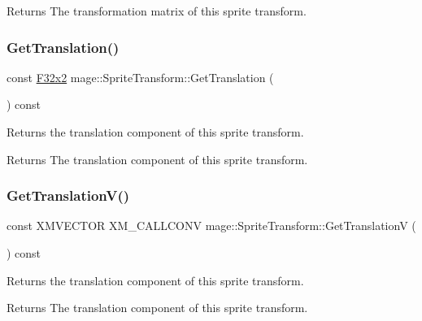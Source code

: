 \begin{DoxyReturn}{Returns}
The transformation matrix of this sprite transform. 
\end{DoxyReturn}
\mbox{\label{classmage_1_1_sprite_transform_a89022e79bd08b6efeb6f660a0da782f0}} 
\subsubsection{\texorpdfstring{Get\+Translation()}{GetTranslation()}}
{\footnotesize\ttfamily const \mbox{\hyperlink{namespacemage_a9dc0d34d6ecc87e4cfa4a826102117bc}{F32x2}} mage\+::\+Sprite\+Transform\+::\+Get\+Translation (\begin{DoxyParamCaption}{ }\end{DoxyParamCaption}) const\hspace{0.3cm}{\ttfamily [noexcept]}}

Returns the translation component of this sprite transform.

\begin{DoxyReturn}{Returns}
The translation component of this sprite transform. 
\end{DoxyReturn}
\mbox{\label{classmage_1_1_sprite_transform_af3b66de480287ea042b84557aadd6be1}} 
\subsubsection{\texorpdfstring{Get\+Translation\+V()}{GetTranslationV()}}
{\footnotesize\ttfamily const X\+M\+V\+E\+C\+T\+OR X\+M\+\_\+\+C\+A\+L\+L\+C\+O\+NV mage\+::\+Sprite\+Transform\+::\+Get\+TranslationV (\begin{DoxyParamCaption}{ }\end{DoxyParamCaption}) const\hspace{0.3cm}{\ttfamily [noexcept]}}

Returns the translation component of this sprite transform.

\begin{DoxyReturn}{Returns}
The translation component of this sprite transform. 
\end{DoxyReturn}
\mbox{\label{classmage_1_1_sprite_transform_a27f93a491eed09c33f1ac547df011867}} 
